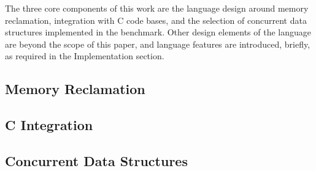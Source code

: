 The three core components of this work are the language design around memory reclamation, integration with C code bases, and the selection of concurrent data structures implemented in the benchmark.  Other design elements of the language are beyond the scope of this paper, and language features are introduced, briefly, as required in the Implementation section.

\subsection{Memory Reclamation}



\subsection{C Integration}

\subsection{Concurrent Data Structures}
